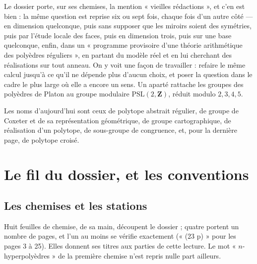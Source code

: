 \documentclass[11pt,a4paper]{article}
\begin{document}
\begin{resume}
Le dossier porte, sur ses chemises, la mention « vieilles rédactions », et
c'en est bien : la même question est reprise six ou sept fois, chaque fois
d'un autre côté --- en dimension quelconque, puis sans supposer que les
miroirs soient des symétries, puis par l'étude locale des faces, puis en
dimension trois, puis sur une base quelconque, enfin, dans un « programme
provisoire d'une théorie arithmétique des polyèdres réguliers », en partant du
modèle réel et en lui cherchant des réalisations sur tout anneau. On y voit
une façon de travailler : refaire le même calcul jusqu'à ce qu'il ne dépende
plus d'aucun choix, et poser la question dans le cadre le plus large où elle a
encore un sens. Un aparté rattache les groupes des polyèdres de Platon au
groupe modulaire $\mathrm{PSL}(2, \mathbf{Z})$, réduit modulo $2, 3, 4, 5$.

Les noms d'aujourd'hui sont ceux de polytope abstrait régulier, de groupe de
Coxeter et de sa représentation géométrique, de groupe cartographique, de
réalisation d'un polytope, de sous-groupe de congruence, et, pour la dernière
page, de polytope croisé.

\end{resume}

\section*{Le fil du dossier, et les conventions}

\subsection*{Les chemises et les stations}

Huit feuilles de chemise, de sa main, découpent le dossier ; quatre portent un
nombre de pages, et l'un au moins se vérifie exactement (« (23 p) » pour les
pages 3 à 25). Elles donnent ses titres aux parties de cette lecture. Le mot
« $n$-hyperpolyèdres » de la première chemise n'est repris nulle part ailleurs.
\end{document}
